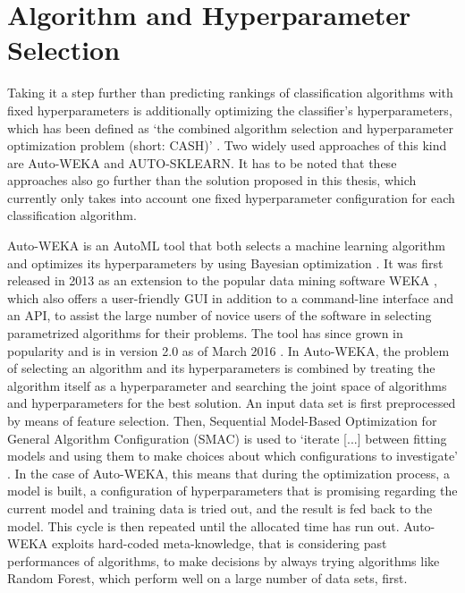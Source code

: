 \section{Algorithm and Hyperparameter Selection}
\label{sec:related:cash}
Taking it a step further than predicting rankings of classification algorithms with fixed hyperparameters is additionally optimizing the classifier's hyperparameters, which has been defined as `the combined algorithm selection and hyperparameter optimization problem (short: CASH)' \cite{thornton2013auto}. Two widely used approaches of this kind are Auto-WEKA and AUTO-SKLEARN. It has to be noted that these approaches also go further than the solution proposed in this thesis, which currently only takes into account one fixed hyperparameter configuration for each classification algorithm. 

Auto-WEKA is an AutoML tool that both selects a machine learning algorithm and optimizes its hyperparameters by using Bayesian optimization \cite{thornton2013auto}. It was first released in 2013 as an extension to the popular data mining software WEKA \cite{hall2009weka}, which also offers a user-friendly GUI in addition to a command-line interface and an API, to assist the large number of novice users of the software in selecting parametrized algorithms for their problems. The tool has since grown in popularity and is in version 2.0 as of March 2016 \cite{kotthoff2016auto}. In Auto-WEKA, the problem of selecting an algorithm and its hyperparameters is combined by treating the algorithm itself as a hyperparameter and searching the joint space of algorithms and hyperparameters for the best solution. An input data set is first preprocessed by means of feature selection. Then, Sequential Model-Based Optimization for General Algorithm Configuration (SMAC) is used to `iterate [...] between fitting models and using them to make choices about which configurations to investigate' \cite{hutter2011sequential}. In the case of Auto-WEKA, this means that during the optimization process, a model is built, a configuration of hyperparameters that is promising regarding the current model and training data is tried out, and the result is fed back to the model. This cycle is then repeated until the allocated time has run out. Auto-WEKA exploits hard-coded meta-knowledge, that is considering past performances of algorithms, to make decisions by always trying algorithms like Random Forest, which perform well on a large number of data sets, first. \\

